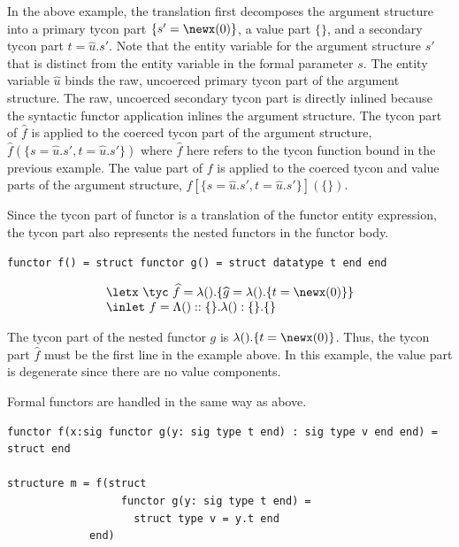 \documentclass[9pt,nocopyrightspace, fleqn]{sigplanconf}
\begin{document}
In the above example, the translation first decomposes the argument
structure into a
primary tycon part $\{s'=\newx(0)\}$, a value part $\{ \}$, and a
secondary tycon part $t = \widehat{u}.s'$. Note that the entity
variable for the argument structure $s'$ that is distinct from
the entity variable in the formal parameter $s$. The entity
variable $\widehat{u}$ binds the raw, uncoerced primary tycon part of the
argument structure. The raw, uncoerced secondary tycon part is
directly inlined because the syntactic functor application inlines the
argument structure. The tycon part of $\widehat{f}$ is applied to the coerced
tycon part of the argument structure, $\widehat{f}(\{s=\widehat{u}.s',
t=\widehat{u}.s'\})$ where $\widehat{f}$ here refers to the tycon
function bound in the previous example. The value part of $f$ is
applied to the coerced tycon and value parts of the argument
structure, $f[\{s=\widehat{u}.s',t=\widehat{u}.s'\}]
(\{\})$.

Since the tycon part of functor is a translation of the functor entity
expression, the tycon part also represents the nested functors in the
functor body. 

\begin{lstlisting}
functor f() = struct functor g() = struct datatype t end end
\end{lstlisting}
\[ \begin{array}{l}
\letx~\tyc~\widehat{f} = \lambda().\{\widehat{g} = \lambda().\{ t =
\newx(0) \} \}\\
   \inlet~f = \Lambda()::\{\}.\lambda():\{\}.\{\}
\end{array}
\]

The tycon part of the nested functor $g$ is $\lambda().\{t =
\newx(0)\}$. Thus, the tycon part $\widehat{f}$ must be the first line in the
example above. In this example, the value part is degenerate since
there are no value components. 

Formal functors are handled in the same way as above. 

\begin{lstlisting}
functor f(x:sig functor g(y: sig type t end) : sig type v end end) =
struct end

structure m = f(struct 
                  functor g(y: sig type t end) = 
                    struct type v = y.t end 
             end)
\end{lstlisting}
\end{document}
